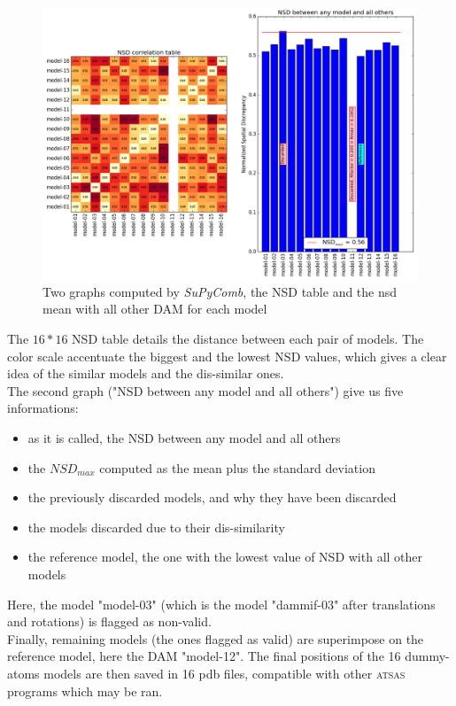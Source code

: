 \documentclass[a4paper, 11pt]{report}
\begin{document}
\begin{figure}
\centering
\includegraphics[scale=0.45]{nsd.png}
\caption{Two graphs computed by \textit{SuPyComb}, the NSD table and 
         the nsd mean with all other DAM for each model}
\label{fgr:nsd}
\end{figure}
The $16*16$ NSD table details the distance between each pair of 
models. 
The color scale accentuate the biggest and the lowest NSD values, 
which gives a clear idea of the similar models and the dis-similar 
ones.\\
The second graph ("NSD between any model and all others") give us 
five informations:
\begin{itemize}
\item as it is called, the NSD between any model and all others
\item the $NSD_{max}$ computed as the mean plus the standard deviation
\item the previously discarded models, and why they have been discarded
\item the models discarded due to their dis-similarity
\item the reference model, the one with the lowest value of NSD with 
      all other models
\end{itemize}
Here, the model "model-03" (which is the model "dammif-03" after 
translations and rotations) is flagged as non-valid.\\
Finally, remaining models (the ones flagged as valid) are superimpose 
on the reference model, here the DAM "model-12". 
The final positions of the 16 dummy-atoms models are then saved in 16 
pdb files, compatible with other \textsc{atsas} programs which may be 
ran.
\end{document}
